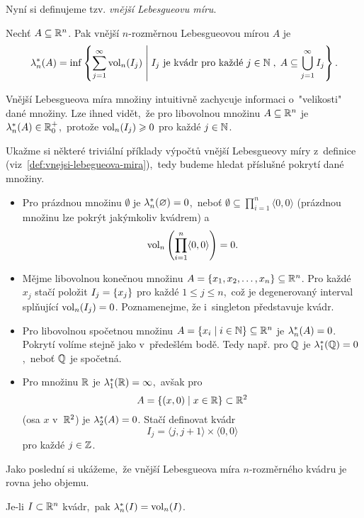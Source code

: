 Nyní si definujeme tzv. \emph{vnější Lebesgueovu míru}.
\begin{definition}\label{def:vnejsi-lebegueova-mira}
    Nechť $A\subseteq\mathbb{R}^n$. Pak vnější $n$-rozměr\-nou Lebesgueovou mírou $A$ je
    \[\lambda_n^*(A)=\inf\left\{\sum_{j=1}^{\infty}\operatorname{vol}_n(I_j)\;\middle|\;\text{$I_j$ je kvádr pro každé $j\in\mathbb{N}$}\;,\;A\subseteq\bigcup_{j=1}^\infty I_j\right\}.\]
\end{definition}
Vnější Lebesgueova míra množiny intuitivně zachycuje informaci o~"velikosti" dané množiny.  Lze ihned vidět,~že pro libovolnou množinu $A\subseteq\mathbb{R}^n$ je $\lambda_n^*(A)\in\mathbb{R}_0^+$,~protože $\operatorname{vol}_n(I_j)\geqslant0$ pro každé $j\in\mathbb{N}$.
\begin{example}\label{ex:lebegueova-mira-trivialni-priklady}
    Ukažme si některé triviální příklady výpočtů vnější Lebesgueovy míry z~definice (viz~\ref{def:vnejsi-lebegueova-mira}),~tedy budeme hledat příslušné pokrytí dané množiny.
    \begin{itemize}
        \item Pro prázdnou množinu $\emptyset$ je $\lambda_n^*(\varnothing)=0$,~neboť $\emptyset\subseteq\prod_{i=1}^{n}\langle0,0\rangle$ (prázdnou množinu lze pokrýt jakýmkoliv kvádrem) a
        \[\operatorname{vol}_n\left(\prod_{i=1}^{n}\langle0,0\rangle\right)=0.\]
        \item Mějme libovolnou konečnou množinu $A=\left\{x_1,x_2,\dots,x_n\right\}\subseteq\mathbb{R}^n$. Pro každé $x_j$ stačí položit $I_j=\left\{x_j\right\}$ pro každé $1\leqslant j\leqslant n$,~což je degenerovaný interval splňující $\operatorname{vol}_n(I_j)=0$. Poznamenejme, že i~singleton představuje kvádr.
        \item Pro libovolnou spočetnou množinu $A=\left\{x_i\mid i\in\mathbb{N}\right\}\subseteq\mathbb{R}^n$ je $\lambda_n^*(A)=0$. Pokrytí volíme stejně jako v~předešlém bodě. Tedy např. pro $\mathbb{Q}$ je $\lambda_1^*(\mathbb{Q})=0$,~neboť $\mathbb{Q}$ je spočetná.
        \item Pro množinu $\mathbb{R}$ je $\lambda_1^*(\mathbb{R})=\infty$,~avšak pro 
        \[A=\left\{(x,0)\mid x\in\mathbb{R}\right\}\subset\mathbb{R}^2\]
        (osa $x$ v~$\mathbb{R}^2$) je $\lambda_2^*(A)=0$. Stačí definovat kvádr
        \[I_j=\langle j,j+1\rangle\times\langle 0,0\rangle\]
        pro každé $j\in\mathbb{Z}$.
    \end{itemize}
\end{example}
Jako poslední si ukážeme,~že vnější Lebesgueova míra $n$-rozměrného kvádru je rovna jeho objemu.
\begin{proposition}\label{prop:lebegueova-mira-objem-kvadru}
    Je-li $I\subset\mathbb{R}^n$ kvádr,~pak $\lambda_n^*(I)=\operatorname{vol}_n(I)$.
\end{proposition}
